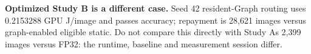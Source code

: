 \textbf{Optimized Study B is a different case.} Seed 42 resident-Graph routing uses 0.2153288 GPU J/image and passes accuracy; repayment is 28,621 images versus graph-enabled eligible static. Do not compare this directly with Study A\textquotesingle s 2,399 images versus FP32: the runtime, baseline and measurement session differ.
